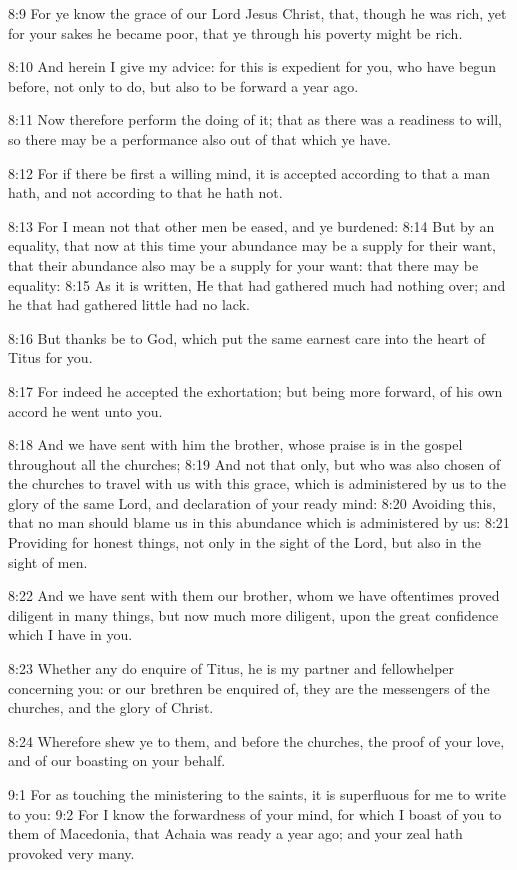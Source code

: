 8:9 For ye know the grace of our Lord Jesus Christ, that, though he
was rich, yet for your sakes he became poor, that ye through his
poverty might be rich.

8:10 And herein I give my advice: for this is expedient for you, who
have begun before, not only to do, but also to be forward a year ago.

8:11 Now therefore perform the doing of it; that as there was a
readiness to will, so there may be a performance also out of that
which ye have.

8:12 For if there be first a willing mind, it is accepted according to
that a man hath, and not according to that he hath not.

8:13 For I mean not that other men be eased, and ye burdened: 8:14 But
by an equality, that now at this time your abundance may be a supply
for their want, that their abundance also may be a supply for your
want: that there may be equality: 8:15 As it is written, He that had
gathered much had nothing over; and he that had gathered little had no
lack.

8:16 But thanks be to God, which put the same earnest care into the
heart of Titus for you.

8:17 For indeed he accepted the exhortation; but being more forward,
of his own accord he went unto you.

8:18 And we have sent with him the brother, whose praise is in the
gospel throughout all the churches; 8:19 And not that only, but who
was also chosen of the churches to travel with us with this grace,
which is administered by us to the glory of the same Lord, and
declaration of your ready mind: 8:20 Avoiding this, that no man should
blame us in this abundance which is administered by us: 8:21 Providing
for honest things, not only in the sight of the Lord, but also in the
sight of men.

8:22 And we have sent with them our brother, whom we have oftentimes
proved diligent in many things, but now much more diligent, upon the
great confidence which I have in you.

8:23 Whether any do enquire of Titus, he is my partner and
fellowhelper concerning you: or our brethren be enquired of, they are
the messengers of the churches, and the glory of Christ.

8:24 Wherefore shew ye to them, and before the churches, the proof of
your love, and of our boasting on your behalf.

9:1 For as touching the ministering to the saints, it is superfluous
for me to write to you: 9:2 For I know the forwardness of your mind,
for which I boast of you to them of Macedonia, that Achaia was ready a
year ago; and your zeal hath provoked very many.

